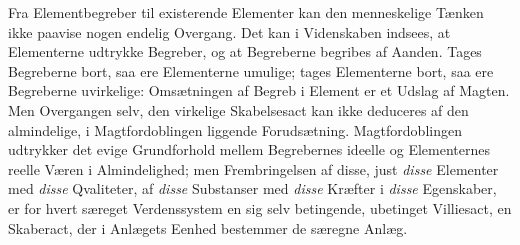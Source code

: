 \documentclass[12pt,a4paper]{book}
\begin{document}
Fra Elementbegreber til existerende Elementer kan den menneskelige Tænken
ikke paavise nogen endelig Overgang. Det kan i Videnskaben indsees, at
Elementerne udtrykke Begreber, og at Begreberne begribes af Aanden. Tages
Begreberne bort, saa ere Elementerne umulige; tages Elementerne bort, saa
ere Begreberne uvirkelige: Omsætningen af Begreb i Element er et Udslag af
Magten. Men Overgangen selv, den virkelige Skabelsesact kan ikke deduceres
af den almindelige, i Magtfordoblingen liggende Forudsætning.
Magtfordoblingen udtrykker det evige Grundforhold mellem Begrebernes
ideelle og Elementernes reelle Væren i Almindelighed; men Frembringelsen
af disse, just \emph{disse} Elementer med \emph{disse} Qvaliteter, af
\emph{disse} Substanser med \emph{disse} Kræfter i \emph{disse}
Egenskaber, er for hvert særeget Verdenssystem en sig selv betingende,
ubetinget Villiesact, en Skaberact, der i Anlægets Eenhed bestemmer de
særegne Anlæg.
\end{document}
